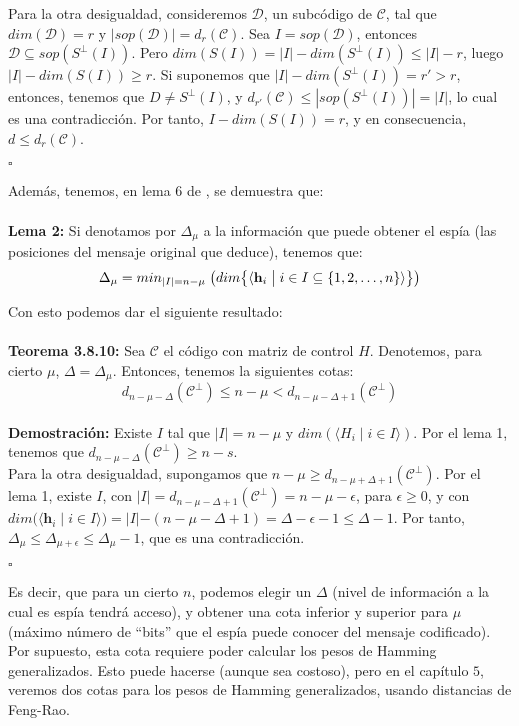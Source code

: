 \documentclass[11pt,spanish]{book}
\newcommand{\qed}{\begin{flushright} $\square$ \end{flushright}}
\begin{document}
Para la otra desigualdad, consideremos $\mathcal{D}$, un subcódigo de $\mathcal{C}$, tal que $dim(\mathcal{D})=r$ y $|sop(\mathcal{D})|=d_r(\mathcal{C})$. 
Sea $I=sop(\mathcal{D})$, entonces $\mathcal{D}\subseteq sop(S^{\perp}(I))$. 
Pero $dim(S(I))=|I|-dim(S^{\perp}(I))\leq |I|-r$, luego $|I|-dim(S(I))\geq r$. 
Si suponemos que $ |I|-dim(S^{\perp}(I))=r'>r$, entonces, tenemos que $D\neq S^{\perp}(I)$, y $d_{r'}(\mathcal{C})\leq |sop(S^{\perp}(I))|=|I|$, lo cual es una contradicción. Por tanto, $I-dim(S(I))=r$, y en consecuencia, $d\leq d_r(\mathcal{C})$. 
\qed

Además, tenemos, en lema 6 de \cite{Wire-tap}, se demuestra que:\\
\\ \textbf{Lema 2:} Si denotamos por $\Delta_{\mu}$ a la información que puede obtener el espía (las posiciones del mensaje original que deduce), tenemos que:
$$\Delta_{\mu} = min_{|I|=n-\mu}\;\big{(}dim\big{\{}\langle \mathbf{h}_i\;\big{|}\; i\in I\subseteq\{1,2,\ldots,n\}\rangle\big{\}}\big{)}$$

Con esto podemos dar el siguiente resultado:\\
\\ \textbf{Teorema 3.8.10: } Sea $\mathcal{C}$ el código con matriz de control $H$. Denotemos, para cierto $\mu$, $\Delta=\Delta_{\mu}$. Entonces, tenemos la siguientes cotas:
$$d_{n-\mu-\Delta}(\mathcal{C}^{\perp})\leq n-\mu<d_{n-\mu-\Delta +1}(\mathcal{C}^{\perp})$$
\\ \textbf{Demostración:}
Existe $I$ tal que $|I|=n-\mu$ y $dim(\langle H_i\;|\; i\in I\rangle)$. Por el lema 1, tenemos que $d_{n-\mu-\Delta}(\mathcal{C}^{\perp})\geq n-s$.\\

Para la otra desigualdad, supongamos que $n-\mu\geq d_{n-\mu+\Delta+1}(\mathcal{C}^{\perp})$. Por el lema 1, existe $I$, con $|I|=d_{n-\mu-\Delta+1}(\mathcal{C}^{\perp})=n-\mu-\epsilon$, para $\epsilon\geq 0$, y con $dim(\langle\mathbf{h}_i\;|\;i\in I \rangle)=|I|-(n-\mu-\Delta +1)=\Delta - \epsilon-1\leq \Delta -1$. Por tanto, $\Delta_{\mu}\leq \Delta_{\mu+\epsilon}\leq \Delta_{\mu}-1$, que es una contradicción. 
\qed

Es decir, que para un cierto $n$, podemos elegir un $\Delta$ (nivel de información a la cual es espía tendrá acceso), y obtener una cota inferior y superior para $\mu$ (máximo número de ``bits'' que el espía puede conocer del mensaje codificado). 
\\ Por supuesto, esta cota requiere poder calcular los pesos de Hamming generalizados. Esto puede hacerse (aunque sea costoso), pero en el capítulo $5$, veremos dos cotas para los pesos de Hamming generalizados, usando distancias de Feng-Rao.
\end{document}

